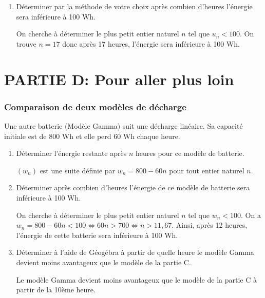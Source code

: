 \begin{enumerate}[series=monDS, resume]
\item Déterminer par la méthode de votre choix après combien d'heures l'énergie sera inférieure à 100 Wh.
\begin{blocvisiblex}[height=1.5]
{\quad}
On cherche à déterminer le plus petit entier naturel $n$ tel que $u_n<100$. 
On trouve $n=17$ donc après 17 heures, l'énergie sera inférieure à 100 Wh.
\end{blocvisiblex}

\end{enumerate}

\pagebreak

\thispagestyle{DS_LP}
\section*{PARTIE D: Pour aller plus loin}


\subsubsection*{Comparaison de deux modèles de décharge}

Une autre batterie (Modèle Gamma) suit une décharge linéaire. Sa capacité initiale est de 800 Wh et elle perd 60 Wh chaque heure. 

\begin{enumerate}[series=monDS, resume]
    \item Déterminer l'énergie restante après $n$ heures pour ce modèle de batterie.
    \begin{blocvisiblex}[height=1]
    {\quad}
    $(w_n)$ est une suite définie par $w_n=800-60n$ pour tout entier naturel $n$.
    \end{blocvisiblex}
    \medskip
    \item Déterminer après combien d'heures l'énergie de ce modèle de batterie sera inférieure à 100 Wh.
    \begin{blocvisiblex}[height=1.5]
    {\quad} 
    On cherche à déterminer le plus petit entier naturel $n$ tel que $w_n<100$.
    On a $w_n=800-60n<100 \Leftrightarrow 60n>700 \Leftrightarrow n>11,67$.
    Ainsi, après 12 heures, l'énergie de cette batterie sera inférieure à 100 Wh.
    \end{blocvisiblex}
    \medskip
    \item Déterminer à l'aide de Géogébra à partir de quelle heure le modèle Gamma devient moins avantageux que le modèle de la partie C.
    \begin{blocvisiblex}[height=1.]
    {\quad}
    Le modèle Gamma devient moins avantageux que le modèle de la partie C à partir de la 10ème heure.
    \end{blocvisiblex}
    \end{enumerate}


